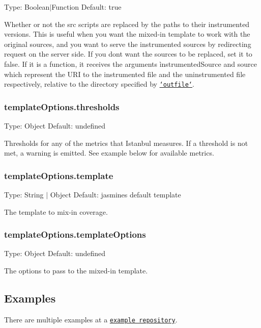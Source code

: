 Type\+: {\ttfamily Boolean$\vert$\+Function} Default\+: {\ttfamily true}

Whether or not the {\ttfamily src} scripts are replaced by the paths to their instrumented versions. This is useful when you want the mixed-\/in template to work with the original sources, and you want to serve the instrumented sources by redirecting request on the server side. If you don\textquotesingle{}t want the sources to be replaced, set it to {\ttfamily false}. If it is a function, it receives the arguments {\ttfamily ìnstrumented\+Source} and {\ttfamily source} which represent the U\+R\+I to the instrumented file and the uninstrumented file respectively, relative to the directory specified by \href{https://github.com/gruntjs/grunt-contrib-jasmine#optionsoutfile}{\tt `outfile`}.

\subsubsection*{template\+Options.\+thresholds}

Type\+: {\ttfamily Object} Default\+: {\ttfamily undefined}

Thresholds for any of the metrics that Istanbul measures. If a threshold is not met, a warning is emitted. See example below for available metrics.

\subsubsection*{template\+Options.\+template}

Type\+: {\ttfamily String $\vert$ Object} Default\+: jasmine\textquotesingle{}s default template

The template to mix-\/in coverage.

\subsubsection*{template\+Options.\+template\+Options}

Type\+: {\ttfamily Object} Default\+: {\ttfamily undefined}

The options to pass to the mixed-\/in template.

\subsection*{Examples}

There are multiple examples at a \href{https://github.com/maenu/grunt-template-jasmine-istanbul-example}{\tt example repository}.

